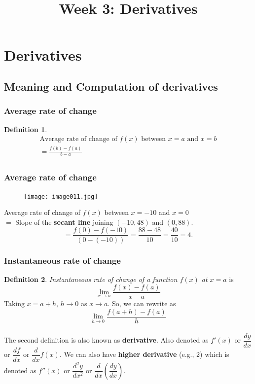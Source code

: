\documentclass[t]{beamer}
\title{Week 3:  Derivatives}
\theoremstyle{plain}
\theoremstyle{definition}
\newtheorem{dfn}{Definition}
\begin{document}
\frame{\titlepage}

\setcounter{tocdepth}{2}
\frame{\tableofcontents

}



\section{Derivatives}
\subsection{Meaning and Computation of derivatives}

\frame
{
\frametitle{Average rate of change}
\begin{dfn}
\begin{multline*} \text{Average rate of change of }f(x)\text{ between }x=a\text{ and }x=b\\=\frac{f(b)-f(a)}{b-a}\\
\end{multline*} 
\end{dfn}
}

\frame
{
\frametitle{Average rate of change}
\begin{figure}[t]
\begin{center}
\texttt{[image: image011.jpg]}
\end{center}
\end{figure}

Average rate of change of $f(x)$ between $x=-10$ and $x=0$ \\ 
 $=$ Slope of the \textbf{secant line} joining $(-10, 48)$ and $(0,88)$.
 \[ =\frac{f(0)-f(-10)}{(0-(-10))}
=\frac{88-48}{10}=\frac{40}{10}=4. \]
}

\frame
{
\frametitle{Instantaneous rate of change}
\begin{dfn}
{\em Instantaneous rate of change of a function $f(x)$ at $x=a$} is \[\lim_{x\to a}\frac{f(x)-f(a)}{x-a}\]
Taking $x=a+h$, $h\to 0$ as $x\to a$. So, we can rewrite as 
\[\lim_{h\to 0}\frac{f(a+h)-f(a)}{h}\]\\
The second definition is also known as \textbf{derivative}.  Also denoted as $f'(x)$ or $\dfrac{dy}{dx}$ or $\dfrac{df}{dx}$ or $\dfrac{d}{dx}f(x)$.   We can also have \textbf{higher derivative} (e.g., 2) which is denoted as $f''(x)$ or $\dfrac{d^2y}{dx^2}$ or $\dfrac{d}{dx}(\dfrac{dy}{dx})$. 
\end{dfn}

}
\end{document}
